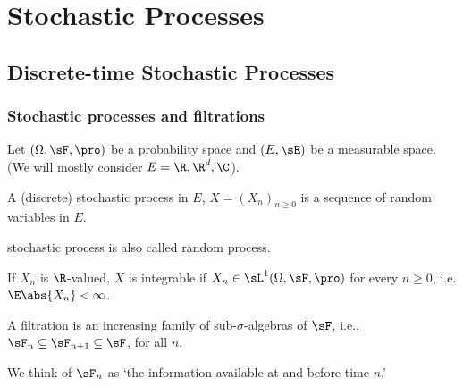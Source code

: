 \chapter{Stochastic Processes}

\section{Discrete-time Stochastic Processes}

\subsection{Stochastic processes and filtrations}

Let $(\Omega,\sF,\pro)$ be a probability space and $(E,\sE)$ be a measurable space. (We will mostly consider $E =\R,\R^d,\C$). %

\begin{definition}
A (discrete) stochastic process in $E$, $X = (X_n)_{n\geq 0}$ is a sequence of random variables in $E$.
\end{definition}

\begin{remark}
stochastic process is also called random process.
\end{remark}

\begin{definition}\label{def:integrable_stochastic_process_discrete}
If $X_n$ is $\R$-valued, $X$ is integrable if $X_n \in \sL^1(\Omega,\sF,\pro)$ for every $n\geq 0$, i.e. $\E\abs{X_n} <\infty$.
\end{definition}

\begin{definition}\label{def:filtration_discrete}
A filtration is an increasing family of sub-$\sigma$-algebras of $\sF$, i.e., $\sF_{n}\subseteq \sF_{n+1}\subseteq \sF$, for all $n$. %
\end{definition}

\begin{remark}
We think of $\sF_n$ as `the information available at and before time $n$.'
\end{remark}

